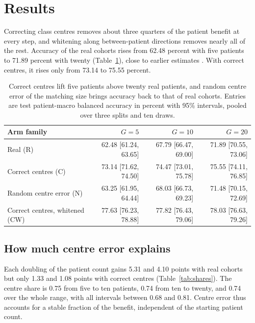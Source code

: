 \documentclass[11pt]{article}
\begin{document}
\section{Results}
\label{sec:results}
Correcting class centres removes about three quarters of the patient benefit at every step, and whitening along between-patient directions removes nearly all of the rest. Accuracy of the real cohorts rises from 62.48 percent with five patients to 71.89 percent with twenty (Table~\ref{tab:accuracy}), close to earlier estimates \citep{queisler2026effectiveSupport,queisler2026hullCoverage}. With correct centres, it rises only from 73.14 to 75.55 percent.

\begin{table}[htbp]
\centering
\small
\renewcommand{\arraystretch}{1.15}
\begin{tabular}{@{}lrrr@{}}
\toprule
Arm family & $G=5$ & $G=10$ & $G=20$ \\
\midrule
Real (R) & 62.48 [61.24, 63.65] & 67.79 [66.47, 69.00] & 71.89 [70.55, 73.06] \\
Correct centres (C) & 73.14 [71.62, 74.50] & 74.47 [73.01, 75.78] & 75.55 [74.11, 76.85] \\
Random centre error (N) & 63.25 [61.95, 64.44] & 68.03 [66.73, 69.23] & 71.48 [70.15, 72.69] \\
Correct centres, whitened (CW) & 77.63 [76.23, 78.88] & 77.82 [76.43, 79.06] & 78.03 [76.63, 79.26] \\
\bottomrule
\end{tabular}
\caption{Correct centres lift five patients above twenty real patients, and random centre error of the matching size brings accuracy back to that of real cohorts. Entries are test patient-macro balanced accuracy in percent with 95\% intervals, pooled over three splits and ten draws.}
\label{tab:accuracy}
\end{table}

\subsection{How much centre error explains}
\label{sec:share-results}
Each doubling of the patient count gains 5.31 and 4.10 points with real cohorts but only 1.33 and 1.08 points with correct centres (Table~\ref{tab:shares}). The centre share is 0.75 from five to ten patients, 0.74 from ten to twenty, and 0.74 over the whole range, with all intervals between 0.68 and 0.81. Centre error thus accounts for a stable fraction of the benefit, independent of the starting patient count.
\end{document}
